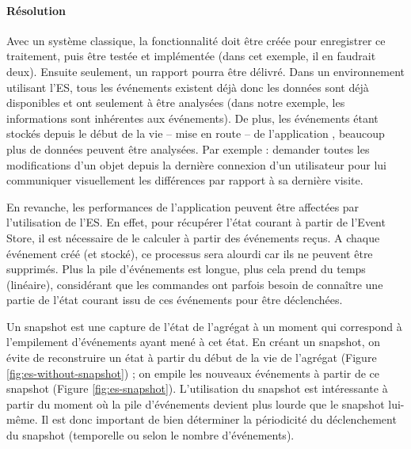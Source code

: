 \paragraph{Résolution} Avec un système classique, la fonctionnalité doit être 
créée pour enregistrer ce traitement, puis être testée et implémentée (dans cet 
exemple, il en faudrait deux). Ensuite seulement, un rapport pourra être délivré. 
Dans un environnement utilisant l'\gls{ES}, tous les événements existent déjà 
donc les données sont déjà disponibles et ont seulement à être analysées 
(dans notre exemple, les informations sont inhérentes aux événements). De plus, 
les événements étant stockés depuis le début de la vie -- mise en route -- de l'application , beaucoup plus de données peuvent être analysées. Par 
exemple : demander toutes les modifications d'un objet depuis la dernière 
connexion d'un utilisateur pour lui communiquer visuellement les différences par 
rapport à sa dernière visite.



En revanche, les performances de l'application peuvent être affectées par 
l'utilisation de 
l'\gls{ES}. En effet, pour récupérer l'état courant à partir de l'Event Store, il est 
nécessaire de le calculer à partir des événements reçus.
A chaque événement créé (et stocké), ce processus sera alourdi car ils ne 
peuvent être supprimés. Plus la pile d'événements est longue, plus cela prend 
du temps (linéaire), considérant que les commandes ont parfois besoin de connaître une
partie de l'état courant issu de ces événements pour être déclenchées.
 
Un \gls{snapshot} est une capture de l'état de l'agrégat à un 
moment qui correspond à l'empilement d'événements ayant mené à cet état. En 
créant un \gls{snapshot}, on évite de reconstruire un état à partir du début de la 
vie de l'agrégat (Figure \ref{fig:es-without-snapshot}) ; on empile les nouveaux 
événements à partir de ce snapshot (Figure \ref{fig:es-snapshot}). 
L'utilisation du \gls{snapshot} est intéressante à partir du moment où la pile 
d'événements devient plus lourde que le \gls{snapshot} lui-même. Il est donc 
important de bien déterminer la périodicité du déclenchement du \gls{snapshot} 
(temporelle ou selon le nombre d'événements).

